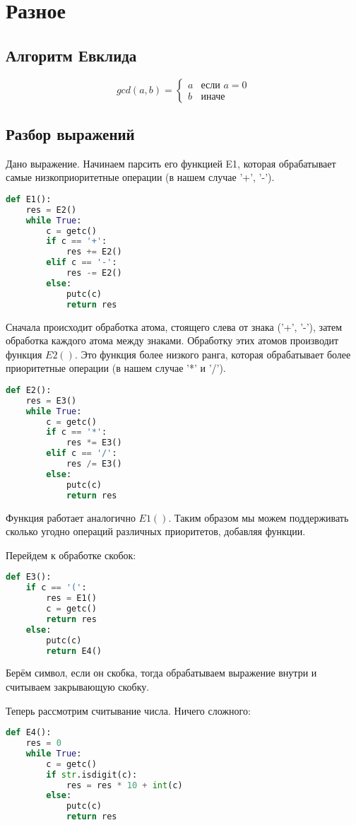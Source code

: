 \chapter{Разное}

\section{Алгоритм Евклида}
\[
	gcd(a, b) = 
		\begin{cases}
			a &\text{если } a = 0 \\
			b & \text{иначе}
		\end{cases}
\]

\section{Разбор выражений}
Дано выражение. Начинаем парсить его функцией E1, которая обрабатывает самые низкоприоритетные операции (в нашем случае '+', '-').
\begin{lstlisting}[language=Python]
def E1():
	res = E2()
	while True:
		c = getc()
		if c == '+':
			res += E2()
		elif c == '-':
			res -= E2()
		else:
			putc(c)
			return res
\end{lstlisting}
Сначала происходит обработка атома, стоящего слева от знака ('+', '-'), затем обработка каждого атома между знаками. Обработку этих атомов производит функция $E2()$. Это функция более низкого ранга, которая обрабатывает более приоритетные операции (в нашем случае '*' и '/').
\begin{lstlisting}[language=Python]
def E2():
	res = E3()
	while True:
		c = getc()
		if c == '*':
			res *= E3()
		elif c == '/':
			res /= E3()
		else:
			putc(c)
			return res
\end{lstlisting}
Функция работает аналогично $E1()$. Таким образом мы можем поддерживать сколько угодно операций различных приоритетов, добавляя функции.

Перейдем к обработке скобок:
\begin{lstlisting}[language=Python]
def E3():
	if c == '(':
		res = E1()
		c = getc()
		return res
	else:
		putc(c)
		return E4()
\end{lstlisting}
Берём символ, если он скобка, тогда обрабатываем выражение внутри и считываем закрывающую скобку.

Теперь рассмотрим считывание числа. Ничего сложного:
\begin{lstlisting}[language=Python]
def E4():
	res = 0
	while True:
		c = getc()
		if str.isdigit(c):
			res = res * 10 + int(c)
		else:
			putc(c)
			return res
\end{lstlisting}